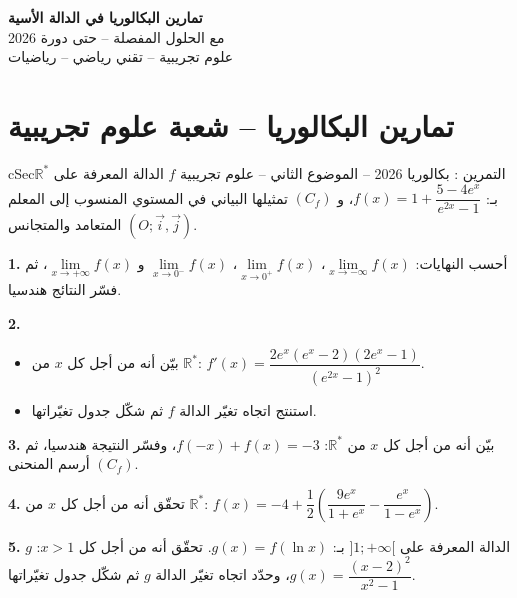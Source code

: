 \documentclass[12pt,a4paper]{article}
\newenvironment{BOX}[2]{\begin{otherlanguage}{english}\begin{arbox}{#1}{#2}}{\end{arbox}\end{otherlanguage}}
\newcounter{exo}
\newenvironment{tamrin}[1]{\stepcounter{exo}\begin{BOX}{cSec}{التمرين \theexo: #1}}{\end{BOX}}
\newenvironment{LTR}{\begin{otherlanguage}{english}}{\end{otherlanguage}}
\newcommand{\R}{\mathbb{R}}
\newenvironment{sq}{\begin{itemize}[leftmargin=2.4em,itemsep=3pt]}{\end{itemize}}
\newcommand{\qa}{\item[(أ)]}\newcommand{\qb}{\item[(ب)]}\newcommand{\qc}{\item[(جـ)]}\newcommand{\qd}{\item[(د)]}\newcommand{\qe}{\item[(هـ)]}
\newcommand{\QQ}[1]{\par\smallskip\textbf{#1.} }
\begin{document}
\begin{LTR}
\begin{tcolorbox}[enhanced,colback=cSec,colframe=cSec,arc=3mm,halign=center,boxrule=0pt,top=12pt,bottom=12pt,before upper={\selectlanguage{arabic}}]
{\color{white}\fontsize{26}{32}\selectfont\bfseries تمارين البكالوريا في الدالة الأسية}\\[8pt]
{\color{white}\large مع الحلول المفصلة -- حتى دورة 2026}\\[5pt]
{\color{white}\large علوم تجريبية -- تقني رياضي -- رياضيات}
\end{tcolorbox}
\end{LTR}
\section{تمارين البكالوريا -- شعبة علوم تجريبية}
\begin{tamrin}{بكالوريا 2026 -- الموضوع الثاني -- علوم تجريبية}
$f$ الدالة المعرفة على $\R^{*}$ بـ: $f(x)=1+\dfrac{5-4e^{x}}{e^{2x}-1}$، و $(C_f)$ تمثيلها البياني في المستوي المنسوب إلى المعلم المتعامد والمتجانس $(O;\vec i,\vec j)$.
\QQ{1} أحسب النهايات: $\lim\limits_{x\to-\infty}f(x)$، $\lim\limits_{x\to0^{+}}f(x)$، $\lim\limits_{x\to0^{-}}f(x)$ و $\lim\limits_{x\to+\infty}f(x)$، ثم فسّر النتائج هندسيا.
\QQ{2}
\begin{sq}
\qa بيّن أنه من أجل كل $x$ من $\R^{*}$: $f'(x)=\dfrac{2e^{x}\left(e^{x}-2\right)\left(2e^{x}-1\right)}{\left(e^{2x}-1\right)^{2}}$.
\qb استنتج اتجاه تغيّر الدالة $f$ ثم شكّل جدول تغيّراتها.
\end{sq}
\QQ{3} بيّن أنه من أجل كل $x$ من $\R^{*}$: $f(-x)+f(x)=-3$، وفسّر النتيجة هندسيا، ثم أرسم المنحنى $(C_f)$.
\QQ{4} تحقّق أنه من أجل كل $x$ من $\R^{*}$: $f(x)=-4+\dfrac{1}{2}\left(\dfrac{9e^{x}}{1+e^{x}}-\dfrac{e^{x}}{1-e^{x}}\right)$.
\QQ{5} $g$ الدالة المعرفة على $]1;+\infty[$ بـ: $g(x)=f(\ln x)$.
تحقّق أنه من أجل كل $x>1$: $g(x)=\dfrac{(x-2)^{2}}{x^{2}-1}$، وحدّد اتجاه تغيّر الدالة $g$ ثم شكّل جدول تغيّراتها.
\end{tamrin}
\end{document}
